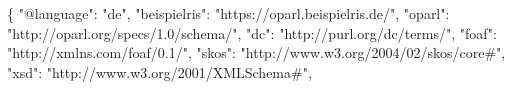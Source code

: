 \documentclass[,a4paper]{article}
\newenvironment{Shaded}{}{}
\newcommand{\DataTypeTok}[1]{\textcolor[rgb]{0.56,0.13,0.00}{{#1}}}
\newcommand{\StringTok}[1]{\textcolor[rgb]{0.25,0.44,0.63}{{#1}}}
\newcommand{\FunctionTok}[1]{\textcolor[rgb]{0.02,0.16,0.49}{{#1}}}
\begin{document}
\begin{Shaded}
\begin{Highlighting}[]
\FunctionTok{\{}
    \DataTypeTok{"@language"}\FunctionTok{:} \StringTok{"de"}\FunctionTok{,}
    \DataTypeTok{"beispielris"}\FunctionTok{:} \StringTok{"https://oparl.beispielris.de/"}\FunctionTok{,}
    \DataTypeTok{"oparl"}\FunctionTok{:} \StringTok{"http://oparl.org/specs/1.0/schema/"}\FunctionTok{,}
    \DataTypeTok{"dc"}\FunctionTok{:} \StringTok{"http://purl.org/dc/terms/"}\FunctionTok{,}
    \DataTypeTok{"foaf"}\FunctionTok{:} \StringTok{"http://xmlns.com/foaf/0.1/"}\FunctionTok{,}
    \DataTypeTok{"skos"}\FunctionTok{:} \StringTok{"http://www.w3.org/2004/02/skos/core#"}\FunctionTok{,}
    \DataTypeTok{"xsd"}\FunctionTok{:} \StringTok{"http://www.w3.org/2001/XMLSchema#"}\FunctionTok{,}


\end{Highlighting}
\end{Shaded}
\end{document}
